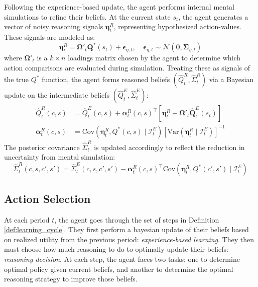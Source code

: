 \begin{definition}
    Following the experience-based update, the agent performs internal mental 
    simulations to refine their beliefs. At the current state $s_t$, the agent 
    generates a vector of noisy reasoning signals $\boldsymbol{\eta}^R_t$, 
    representing hypothesized action-values. These signals are modeled as:
    \begin{equation}
        \boldsymbol{\eta}^R_t = \boldsymbol{\Omega}'_t \boldsymbol{Q}^*(s_t) + \boldsymbol{\epsilon}_{\eta, t}, \quad \boldsymbol{\epsilon}_{\eta, t} \sim \mathcal{N}(\boldsymbol{0}, \boldsymbol{\Sigma}_{\eta, t})
    \end{equation}
    where $\boldsymbol{\Omega}'_t$ is a $k \times n$ loadings matrix chosen by the 
    agent to determine which action comparisons are evaluated during simulation. 
    Treating these as signals of the true $Q^*$ function, the agent forms reasoned 
    beliefs $(\hat{Q}^R_t, \hat{\Sigma}^R_t)$ via a Bayesian update on the intermediate 
    beliefs $(\hat{Q}^E_t, \hat{\Sigma}^E_t)$:
    \begin{align}
        \hat{Q}^R_t(c,s) &= \hat{Q}^E_t(c,s) + \boldsymbol{\alpha}^R_t(c,s)^\top \left[\boldsymbol{\eta}^R_t - \boldsymbol{\Omega}'_t \hat{\boldsymbol{Q}}^E_t(s_t)\right] \\
        \boldsymbol{\alpha}^R_t(c,s) &= \text{Cov}(\boldsymbol{\eta}^R_t, Q^*(c,s) \mid \mathcal{I}^E_t) \left[\text{Var}(\boldsymbol{\eta}^R_t \mid \mathcal{I}^E_t)\right]^{-1}
    \end{align}
    The posterior covariance $\hat{\Sigma}^R_t$ is updated accordingly to reflect the reduction in uncertainty from mental simulation:
    \begin{equation}
        \hat{\Sigma}^R_t(c,s,c',s') = \hat{\Sigma}^E_t(c,s,c',s') - \boldsymbol{\alpha}^R_t(c,s)^\top \text{Cov}(\boldsymbol{\eta}^R_t, Q^*(c',s') \mid \mathcal{I}^E_t)
    \end{equation}
\end{definition}

\subsection{Action Selection}

At each period $t$, the agent goes through the set of steps in Definition \ref{def:learning_cycle}. They first perform a bayesian
update of their beliefs based on realized utility from the previous period: \textit{experience-based learning}.
They then must choose how much reasoning to do to optimally update their beliefs: \textit{reasoning decision}.
At each step, the agent faces two tasks: one to determine optimal policy given current beliefs, and another to determine
the optimal reasoning strategy to improve those beliefs.

